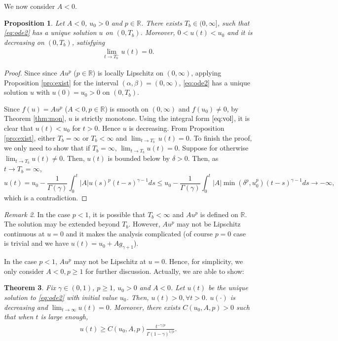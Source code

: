 \documentclass[12pt]{amsart}%
\newtheorem{thm}{Theorem}[section]
\newtheorem{pro}[thm]{Proposition}
\theoremstyle{definition}
\theoremstyle{remark}
\newtheorem{rmk}[thm]{Remark}
\renewcommand{\ge}{\geqslant}
\renewcommand{\le}{\leqslant}
\begin{document}
We now consider $A<0$. 
\begin{pro}\label{pro:negA}
Let $A<0$, $u_0>0$ and $p\in \mathbb{R}$. There exists $T_b\in (0, \infty]$, such that \eqref{eq:ode2} has a unique solution $u$ on $(0, T_b)$. Moreover, $0<u(t)< u_0$ and it is decreasing on $(0, T_b)$, satisfying
\begin{gather}
\lim_{t\to T_b^-}u(t)=0.
\end{gather}
\end{pro}

\begin{proof}
Since since $Au^p$ ($p\in\mathbb{R}$) is locally Lipschitz on $(0, \infty)$, applying Proposition \ref{pro:exist} for the interval $(\alpha, \beta)=(0, \infty)$,  \eqref{eq:ode2} has a unique solution $u$ with $u(0)=u_0>0$ on $(0, T_b)$.

Since $f(u)=Au^p$ ($A<0, p\in\mathbb{R}$) is smooth on $(0,\infty)$ and $f(u_0)\neq 0$, by Theorem \ref{thm:mon}, $u$ is strictly monotone. Using the integral form $\eqref{eq:vol}$, it is clear that $u(t)< u_0$ for $t>0$. Hence $u$ is decreasing. From Proposition \ref{pro:exist}, either $T_b=\infty$ or $T_b<\infty$ and $\lim_{t\to T_b^-}u(t)=0$. To finish the proof, we only need to show that if $T_b=\infty$, $\lim_{t\to T_b}u(t)=0$. Suppose for otherwise $\lim_{t\to T_b}u(t)\neq 0$. Then, $u(t)$ is bounded below by $\delta>0$. 
Then, as $t\to T_b=\infty$, \[
u(t)=u_0-\frac{1}{\Gamma(\gamma)}\int_0^{t}|A| u(s)^p(t-s)^{\gamma-1}ds\le u_0-\frac{1}{\Gamma(\gamma)}\int_0^{t}|A|\min( \delta^p,u_0^p)(t-s)^{\gamma-1}ds  \to -\infty,
\]
which is a contradiction.
\end{proof}

\begin{rmk}
In the case $p<1$, it is possible that $T_b<\infty$ and $Au^p$ is defined on $\mathbb{R}$. The solution may be extended beyond $T_b$. However, $Au^p$ may not be Lipschitz continuous at $u=0$ and it makes the analysis complicated (of course $p=0$ case is trivial and we have $u(t)=u_0+Ag_{\gamma+1}$).
\end{rmk}

In the case $p<1$, $Au^p$ may not be Lipschitz at $u=0$. Hence, for simplicity, we only consider $A<0, p\ge 1$ for further discussion.   Actually, we are able to show:
\begin{thm}\label{thm:slowdecay}
Fix $\gamma\in (0,1)$, $p\ge 1$, $u_0>0$ and $A<0$. Let $u(t)$ be the unique solution to \eqref{eq:ode2} with initial value $u_0$. Then, $u(t)>0, \forall t>0$. $u(\cdot)$ is decreasing and $\lim_{t\to\infty}u(t)=0$. Moreover, there exists $C(u_0,A, p)>0$ such that when $t$ is large enough,
\begin{gather}\label{eq:slowdecay}
u(t)\ge C(u_0,A,p)\frac{t^{-\gamma/p}}{\Gamma(1-\gamma)^{1/p}}.
\end{gather}
\end{thm}
\end{document}
